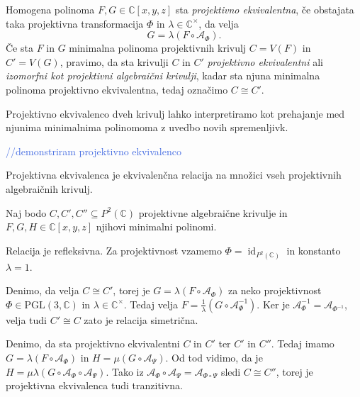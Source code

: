 \documentclass[mat1]{fmfdelo}
\numberwithin{equation}{section}
\newcommand{\C}{\mathbb C}
\newcommand{\CM}{\mathbb C ^\times}
\newcommand{\PC}{P^2(\mathbb C)}
\newcommand{\Cxyz}{\C[x,y,z]}
\newcommand{\inv}{^{-1}}
\newcommand{\kom}[1]{
    \textcolor{RoyalBlue}{//#1}
}
\DeclareMathOperator{\id}{id}
\theoremstyle{definition}
\begin{document}
\begin{definicija}
    Homogena polinoma $F,G \in \Cxyz$ sta \emph{projektivno ekvivalentna}, če obstajata taka projektivna transformacija $\Phi$ in $\lambda \in \CM$, da velja
    $$ G = \lambda (F \circ \mathcal{A}_\Phi). $$
    Če sta $F$ in $G$ minimalna polinoma projektivnih krivulj $C = V(F)$ in $C' = V(G)$, pravimo, da sta krivulji $C$ in $C'$ \emph{projektivno ekvivalentni} ali \emph{izomorfni kot projektivni algebraični krivulji}, kadar sta njuna minimalna polinoma projektivno ekvivalentna, tedaj označimo $C \cong C'$. 
\end{definicija}

Projektivno ekvivalenco dveh krivulj lahko interpretiramo kot prehajanje med njunima minimalnima polinomoma z uvedbo novih spremenljivk.

\begin{primer*}
    \kom{demonstriram projektivno ekvivalenco}
\end{primer*}

\begin{trditev}
    Projektivna ekvivalenca je ekvivalenčna relacija na množici vseh projektivnih algebraičnih krivulj.
\end{trditev}

\begin{dokaz}
    Naj bodo $C, C', C'' \subseteq \PC$ projektivne algebraične krivulje in $F, G, H \in \Cxyz$ njihovi minimalni polinomi. 
    \par Relacija je refleksivna. Za projektivnost vzamemo $\Phi = \id_{\PC}$ in konstanto $\lambda = 1$. 
    \par Denimo, da velja $C \cong C'$, torej je $G = \lambda (F \circ \mathcal{A}_\Phi)$ za neko projektivnost $\Phi \in \operatorname{PGL(3, \C)}$ in $\lambda \in \CM$. Tedaj velja $F = \frac{1}{\lambda} (G \circ \mathcal{A}_\Phi\inv)$. Ker je $\mathcal{A}_\Phi\inv = \mathcal{A}_{\Phi\inv}$, velja tudi $C' \cong C$ zato je relacija simetrična. 
    \par Denimo, da sta projektivno ekvivalentni $C$ in $C'$ ter $C'$ in $C''$. Tedaj imamo $G = \lambda (F \circ \mathcal{A}_\Phi)$ in $H = \mu (G \circ \mathcal{A}_\Psi)$. Od tod vidimo, da je $H = \mu\lambda(G \circ \mathcal{A}_\Phi \circ \mathcal{A}_\Psi)$. Tako iz $\mathcal{A}_\Phi \circ \mathcal{A}_\Psi = \mathcal{A}_{\Phi \circ \Psi}$ sledi $C \cong C''$, torej je projektivna ekvivalenca tudi tranzitivna. 
\end{dokaz}
\end{document}

